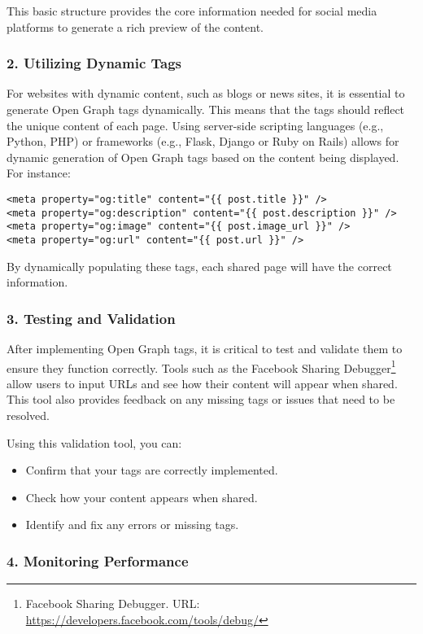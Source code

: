 This basic structure provides the core information needed for social media platforms to generate a rich preview of the content.

\subsubsection{2. Utilizing Dynamic Tags}

For websites with dynamic content, such as blogs or news sites, it is essential to generate Open Graph tags dynamically. This means that the tags should reflect the unique content of each page. Using server-side scripting languages (e.g., Python, PHP) or frameworks (e.g., Flask, Django or Ruby on Rails) allows for dynamic generation of Open Graph tags based on the content being displayed. For instance:

\begin{verbatim}
<meta property="og:title" content="{{ post.title }}" />
<meta property="og:description" content="{{ post.description }}" />
<meta property="og:image" content="{{ post.image_url }}" />
<meta property="og:url" content="{{ post.url }}" />
\end{verbatim}

By dynamically populating these tags, each shared page will have the correct information.

\subsubsection{3. Testing and Validation}

After implementing Open Graph tags, it is critical to test and validate them to ensure they function correctly. Tools such as the Facebook Sharing Debugger\footnote{Facebook Sharing Debugger. URL: \url{https://developers.facebook.com/tools/debug/}} allow users to input URLs and see how their content will appear when shared. This tool also provides feedback on any missing tags or issues that need to be resolved. 

Using this validation tool, you can:

\begin{itemize}
    \item Confirm that your tags are correctly implemented.
    \item Check how your content appears when shared.
    \item Identify and fix any errors or missing tags.
\end{itemize}

\subsubsection{4. Monitoring Performance}

